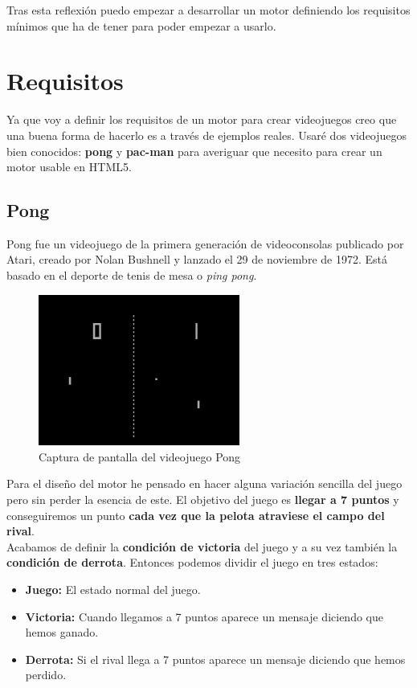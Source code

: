\documentclass[a4paper]{article}
\begin{document}
Tras esta reflexión puedo empezar a desarrollar un motor definiendo los requisitos mínimos que ha de tener para poder empezar a usarlo.

\section{Requisitos}

Ya que voy a definir los requisitos de un motor para crear videojuegos creo que una buena forma de hacerlo es a través de ejemplos reales. Usaré dos videojuegos bien conocidos: \textbf{pong} y \textbf{pac-man} para averiguar que necesito para crear un motor usable en HTML5.

\subsection{Pong}

Pong fue un videojuego de la primera generación de videoconsolas publicado por Atari, creado por Nolan Bushnell y lanzado el 29 de noviembre de 1972. Está basado en el deporte de tenis de mesa o \textit{ping pong}.

\begin{figure}[h]
  \begin{center}
    \includegraphics[width=250px]{images/pong.png}
    \caption{Captura de pantalla del videojuego Pong}
    \label{pong}
  \end{center}
\end{figure}

Para el diseño del motor he pensado en hacer alguna variación sencilla del juego pero sin perder la esencia de este. El objetivo del juego es \textbf{llegar a 7 puntos} y conseguiremos un punto \textbf{cada vez que la pelota atraviese el campo del rival}. \\
Acabamos de definir la \textbf{condición de victoria} del juego y a su vez también la \textbf{condición de derrota}. Entonces podemos dividir el juego en tres estados:
\begin{itemize}
  \item \textbf{Juego:} El estado normal del juego.
  \item \textbf{Victoria:} Cuando llegamos a 7 puntos aparece un mensaje diciendo que hemos ganado.
  \item \textbf{Derrota:} Si el rival llega a 7 puntos aparece un mensaje diciendo que hemos perdido.
\end{itemize}
\end{document}
